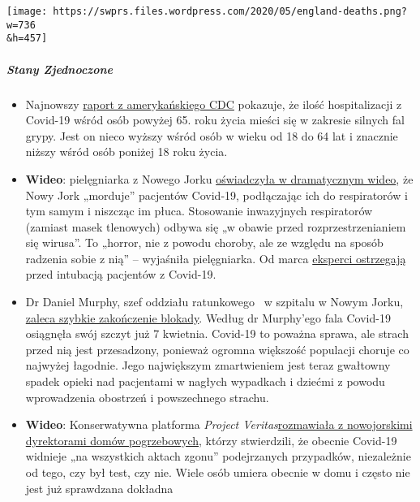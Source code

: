 \texttt{[image: https://swprs.files.wordpress.com/2020/05/england-deaths.png?w=736\\\&h=457]}

\hypertarget{stany-zjednoczone}{%
\subparagraph{\texorpdfstring{\textbf{Stany
Zjednoczone}}{Stany Zjednoczone}}\label{stany-zjednoczone}}

\begin{itemize}
\tightlist
\item
  Najnowszy
  \href{https://www.cdc.gov/coronavirus/2019-ncov/covid-data/covidview/index.html}{raport
  z amerykańskiego CDC} pokazuje, że ilość hospitalizacji z Covid-19
  wśród osób powyżej 65. roku życia mieści się w zakresie silnych fal
  grypy. Jest on nieco wyższy wśród osób w wieku od 18 do 64 lat i
  znacznie niższy wśród osób poniżej 18 roku życia.
\item
  \textbf{Wideo}: pielęgniarka z Nowego Jorku
  \href{https://www.dailymail.co.uk/news/article-8262351/Nurse-New-York-claims-city-killing-COVID-19-patients-putting-ventilators.html}{oświadczyła
  w dramatycznym wideo}, że Nowy Jork „morduje'' pacjentów Covid-19,
  podłączając ich do respiratorów i tym samym i niszcząc im płuca.
  Stosowanie inwazyjnych respiratorów (zamiast masek tlenowych) odbywa
  się „w obawie przed rozprzestrzenianiem się wirusa''. To „horror, nie
  z powodu choroby, ale ze względu na sposób radzenia sobie z nią'' --
  wyjaśniła pielęgniarka. Od marca
  \href{https://apnews.com/8ccd325c2be9bf454c2128dcb7bd616d}{eksperci
  ostrzegają} przed intubacją pacjentów z Covid-19.
\item
  Dr Daniel Murphy, szef oddziału ratunkowego~ w szpitalu w Nowym Jorku,
  \href{https://nypost.com/2020/04/27/ive-worked-the-coronavirus-front-line-and-i-say-its-time-to-start-opening-up/}{zaleca
  szybkie zakończenie blokady}. Według dr Murphy'ego fala Covid-19
  osiągnęła swój szczyt już 7 kwietnia. Covid-19 to poważna sprawa, ale
  strach przed nią jest przesadzony, ponieważ ogromna większość
  populacji choruje co najwyżej łagodnie. Jego największym zmartwieniem
  jest teraz gwałtowny spadek opieki nad pacjentami w nagłych wypadkach
  i dziećmi z powodu wprowadzenia obostrzeń i powszechnego strachu.
\item
  \textbf{Wideo}: Konserwatywna platforma \emph{Project
  Veritas}\href{https://www.youtube.com/watch?v=g5f_6ltv7oI}{rozmawiała
  z nowojorskimi dyrektorami domów pogrzebowych}, którzy stwierdzili, że
  obecnie Covid-19 widnieje „na wszystkich aktach zgonu'' podejrzanych
  przypadków, niezależnie od tego, czy był test, czy nie. Wiele osób
  umiera obecnie w domu i często nie jest już sprawdzana dokładna

\end{itemize}

